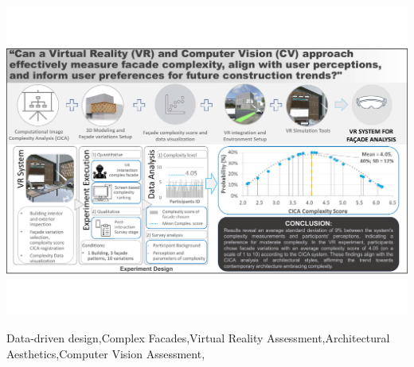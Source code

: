 \documentclass[11pt]{article}
\begin{document}
\begin{frontmatter}
\begin{graphicalabstract}
    \centering
    \includegraphics[width= \textwidth, trim = 0 80 0 80, clip]{Images/GraphicAbstract}
    \label{fig:graphic_abstract}
\end{graphicalabstract}

\begin{highlights}

\end{highlights}

\begin{keyword}
Data-driven design\sep Complex Facades\sep Virtual Reality Assessment\sep Architectural Aesthetics\sep Computer Vision Assessment\sep

\end{keyword}

\end{frontmatter}
%





\end{document}
